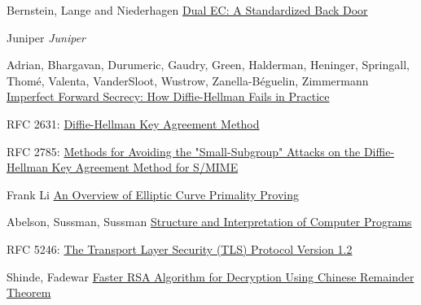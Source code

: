 \documentclass[a4paper,11pt]{article}
\begin{document}
\begin{thebibliography}{1}

 Bernstein, Lange and Niederhagen \href{https://eprint.iacr.org/2015/767.pdf}{Dual EC: A Standardized Back Door}

 Juniper {\em Juniper}

 Adrian, Bhargavan, Durumeric, Gaudry, Green, Halderman, Heninger, Springall, Thomé, Valenta,  VanderSloot, Wustrow, Zanella-Béguelin, Zimmermann \href{https://weakdh.org/imperfect-forward-secrecy-ccs15.pdf}{Imperfect Forward Secrecy: How Diffie-Hellman Fails in Practice}

 RFC 2631: \href{https://tools.ietf.org/html/rfc2631}{Diffie-Hellman Key Agreement Method}

 RFC 2785: \href{https://tools.ietf.org/html/rfc2785}{Methods for Avoiding the "Small-Subgroup" Attacks on the Diffie-Hellman Key Agreement Method for S/MIME}

 Frank Li \href{http://theory.stanford.edu/~dfreeman/cs259c-f11/finalpapers/primalityproving.pdf}{An Overview of Elliptic Curve Primality Proving}

 Abelson, Sussman, Sussman \href{https://mitpress.mit.edu/sicp/chapter1/footnode.html#2413}{Structure and Interpretation of Computer Programs}

 RFC 5246: \href{https://www.ietf.org/rfc/rfc5246.txt}{The Transport Layer Security (TLS) Protocol Version 1.2}

 Shinde, Fadewar \href{http://www.techscience.com/doi/10.3970/icces.2008.005.255.pdf}{Faster RSA Algorithm for Decryption Using Chinese
Remainder Theorem}

\end{thebibliography}
\end{document}
